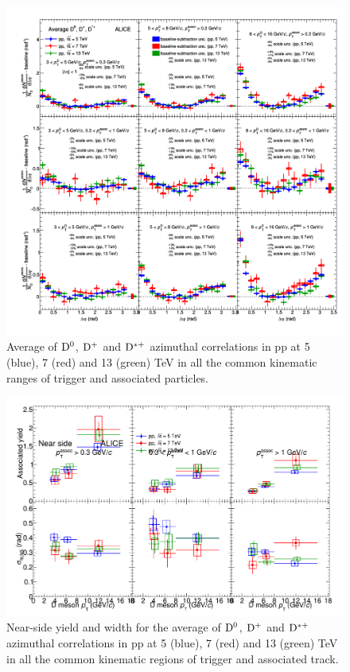 \begin{figure}
\centering
\includegraphics[width=1.1\textwidth, angle=90]{figures/ComparisonToOtherpp/plotComparison_WeightedAverage_pp_vsEnergies_UniqueCanvas_Style1.png}

\caption{Average of ${\rm D^0}$, ${\rm D^+}$ and ${\rm D^{*+}}$ azimuthal correlations in pp at 5 (blue), 7 (red) and 13 (green) TeV in all the common kinematic ranges of trigger and associated particles.}
\label{fig:Allpp}
\end{figure}

\begin{figure}
\centering
\includegraphics[width=.96\textwidth]{figures/ComparisonToOtherpp/CompareFitResults_DiffppEnergies.png}
\caption{Near-side yield and width for the average of ${\rm D^0}$, ${\rm D^+}$ and ${\rm D^{*+}}$ azimuthal correlations in pp at 5 (blue), 7 (red) and 13 (green) TeV in all the common kinematic regions of trigger and associated track.}
\label{fig:AllppFit1}
\end{figure}


